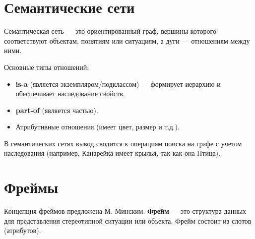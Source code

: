 \documentclass[12pt,a4paper]{article}
\begin{document}
\section{Семантические сети}

Семантическая сеть — это ориентированный граф, вершины которого соответствуют объектам, понятиям или ситуациям, а дуги — отношениям между ними.

Основные типы отношений:
\begin{itemize}
    \item \textbf{is-a} (является экземпляром/подклассом) — формирует иерархию и обеспечивает наследование свойств.
    \item \textbf{part-of} (является частью).
    \item Атрибутивные отношения (имеет цвет, размер и т.д.).
\end{itemize}

\begin{center}
\end{center}

В семантических сетях вывод сводится к операциям поиска на графе с учетом наследования (например, Канарейка имеет крылья, так как она Птица).

\section{Фреймы}

Концепция фреймов предложена М. Минским. \textbf{Фрейм} — это структура данных для представления стереотипной ситуации или объекта. Фрейм состоит из слотов (атрибутов).
\end{document}
